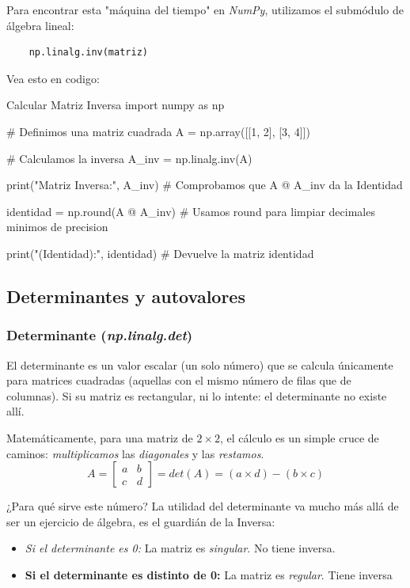 Para encontrar esta "máquina del tiempo" en \textit{NumPy}, utilizamos el submódulo de álgebra lineal:
\begin{verbatim}
    np.linalg.inv(matriz) 
\end{verbatim}

Vea esto en codigo:
\begin{pycode}{Calcular Matriz Inversa}
import numpy as np

# Definimos una matriz cuadrada
A = np.array([[1, 2], [3, 4]])

# Calculamos la inversa
A_inv = np.linalg.inv(A)

print("Matriz Inversa:\n", A_inv) # Comprobamos que A @ A_inv da la Identidad

identidad = np.round(A @ A_inv) # Usamos round para limpiar decimales minimos de precision

print("\nResultado (Identidad):\n", identidad) # Devuelve la matriz identidad
\end{pycode}





\subsection{Determinantes y autovalores}

\subsubsection{Determinante (\textit{np.linalg.det})}

El determinante es un valor escalar (un solo número) que se calcula únicamente para matrices cuadradas (aquellas con el mismo número de filas que de columnas). Si su matriz es rectangular, ni lo intente: el determinante no existe allí.

Matemáticamente, para una matriz de \(2 \times 2\), el cálculo es un simple cruce de caminos: \textit{multiplicamos} las \textit{diagonales} y las \textit{restamos}.
\[A = \begin{bmatrix}
    a & b \\
    c & d
\end{bmatrix} = 
det(A) = (a \times d) - (b \times c)
\]

¿Para qué sirve este número? La utilidad del determinante va mucho más allá de ser un ejercicio de álgebra, es el guardián de la Inversa:
\begin{itemize}
\item \textit{Si el determinante es 0:} La matriz es \textit{singular}. No tiene inversa.
\item \textbf{Si el determinante es distinto de 0:} La matriz es \textit{regular}. Tiene inversa
\end{itemize}

